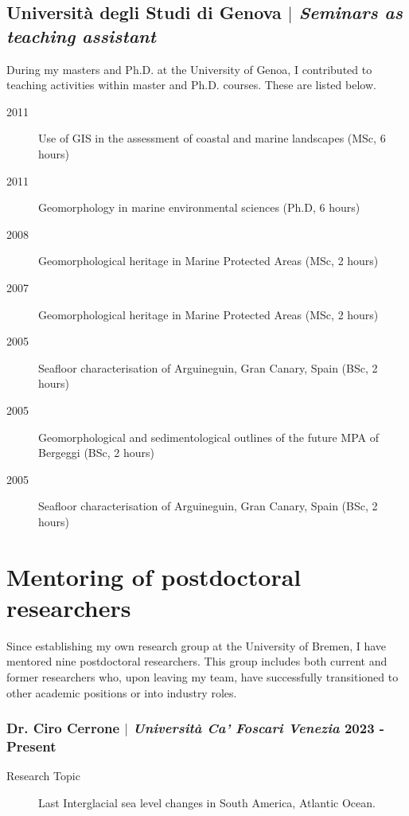 \documentclass[11pt]{article}
\begin{document}
\subsection{Università degli Studi di Genova $|$ {\normalfont\textit{Seminars as teaching assistant}}}
{\footnotesize During my masters and Ph.D. at the University of Genoa, I contributed to teaching activities within master and Ph.D. courses. These are listed below.}
{\footnotesize 
\begin{description}
  \item [2011] Use of GIS in the assessment of coastal and marine landscapes (MSc, 6 hours)
  \item [2011] Geomorphology in marine environmental sciences (Ph.D, 6 hours)
  \item [2008] Geomorphological heritage in Marine Protected Areas (MSc, 2 hours)
  \item [2007] Geomorphological heritage in Marine Protected Areas (MSc, 2 hours)
  \item [2005] Seafloor characterisation of Arguineguin, Gran Canary, Spain (BSc, 2 hours)
  \item [2005] Geomorphological and sedimentological outlines of the future MPA of Bergeggi (BSc, 2 hours)
  \item [2005] Seafloor characterisation of Arguineguin, Gran Canary, Spain (BSc, 2 hours)
\end{description}
}

\section{Mentoring of postdoctoral researchers}
{\normalfont Since establishing my own research group at the University of Bremen, I have mentored nine postdoctoral researchers. This group includes both current and former researchers who, upon leaving my team, have successfully transitioned to other academic positions or into industry roles.}\\
\subsubsection{Dr. Ciro Cerrone $|$ {\normalfont\textit{Università Ca' Foscari Venezia}} \hfill 2023 - Present}
{\footnotesize 
\begin{description}
  \item [Research Topic] Last Interglacial sea level changes in South America, Atlantic Ocean. 
\end{description}
}
\smallskip
\end{document}
